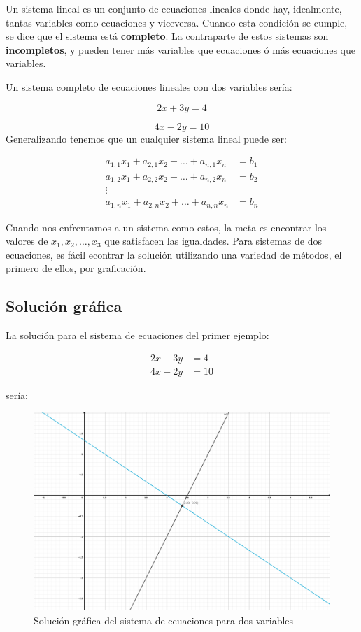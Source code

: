 \documentclass[
]{book}
\begin{document}
Un sistema lineal es un conjunto de ecuaciones lineales donde hay, idealmente, tantas variables como ecuaciones y viceversa. Cuando esta condición se cumple, se dice que el sistema está \textbf{completo}. La contraparte de estos sistemas son \textbf{incompletos}, y pueden tener más variables que ecuaciones ó más ecuaciones que variables.

Un sistema completo de ecuaciones lineales con dos variables sería:

\[2x + 3y = 4\]

\[4x - 2y =10\]
Generalizando tenemos que un cualquier sistema lineal puede ser:

\begin{align}
a_{1,1}x_1+a_{2,1}x_2 + \dots + a_{n,1}x_n & = b_1\\
a_{1,2}x_1+a_{2,2}x_2 + \dots + a_{n,2}x_n & = b_2\\
\vdots & \\
a_{1, n}x_1+a_{2,n}x_2 + \dots + a_{n,n}x_n & = b_n
\end{align}

Cuando nos enfrentamos a un sistema como estos, la meta es encontrar los valores de \(x_1, x_2, \dots , x_3\) que satisfacen las igualdades. Para sistemas de dos ecuaciones, es fácil econtrar la solución utilizando una variedad de métodos, el primero de ellos, por graficación.

\hypertarget{soluciuxf3n-gruxe1fica}{%
\subsection{Solución gráfica}\label{soluciuxf3n-gruxe1fica}}

La solución para el sistema de ecuaciones del primer ejemplo:

\begin{align}
2x + 3y & = 4\\
4x - 2y & =10
\end{align}

sería:

\begin{figure}

{\centering \includegraphics{Unidad-II/Soln-grafica-1} 

}

\caption{Solución gráfica del sistema de ecuaciones para dos variables}\label{fig:unnamed-chunk-23}
\end{figure}
\end{document}
